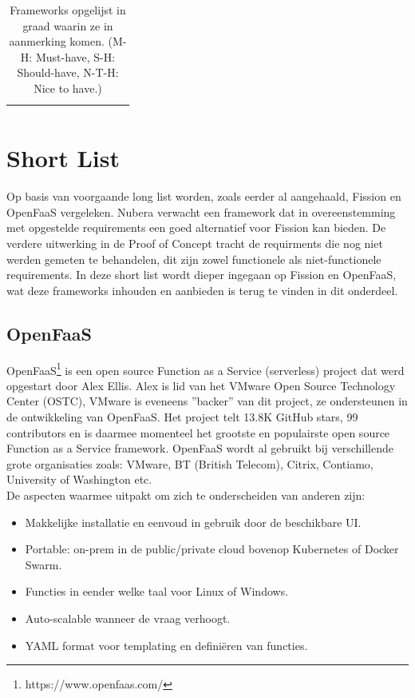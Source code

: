 \begin{table}[]
{\begin{tabular}{@{}llccccccccc@{}}
            &  & \multicolumn{1}{l}{} & \multicolumn{1}{l}{} & \multicolumn{1}{l}{} & \multicolumn{1}{l}{} & \multicolumn{1}{l}{} & \multicolumn{1}{l}{} & \multicolumn{1}{l}{} & \multicolumn{1}{l}{} & \multicolumn{1}{l}{} \\ \bottomrule
        \end{tabular}%
    }
    \caption{Frameworks opgelijst in graad waarin ze in aanmerking komen. (M-H: Must-have, S-H: Should-have, N-T-H: Nice to have.) }
    \label{tab:frameworks-samenvattingl}
\end{table}

\section{Short List}
\label{sec:short-list}
Op basis van voorgaande long list worden, zoals eerder al aangehaald, Fission en OpenFaaS vergeleken. Nubera verwacht een framework dat in overeenstemming met opgestelde requirements een goed alternatief voor Fission kan bieden. De verdere uitwerking in de Proof of Concept tracht de requirments die nog niet werden gemeten te behandelen, dit zijn zowel functionele als niet-functionele requirements. In deze short list wordt dieper ingegaan op Fission en OpenFaaS, wat deze frameworks inhouden en aanbieden is terug te vinden in dit onderdeel.

\subsection{OpenFaaS}
OpenFaaS\footnote{https://www.openfaas.com/} is een open source Function as a Service (serverless) project dat werd opgestart door Alex Ellis. Alex is lid van het VMware Open Source Technology Center (OSTC), VMware is eveneens ''backer'' van dit project, ze ondersteunen in de ontwikkeling van OpenFaaS. Het project telt 13.8K GitHub stars, 99 contributors en is daarmee momenteel het grootste en populairste open source Function as a Service framework. OpenFaaS wordt al gebruikt bij verschillende grote organisaties zoals: VMware, BT (British Telecom), Citrix, Contiamo, University of Washington etc.
\\
De aspecten waarmee \textcite{OpenFaaS2019} uitpakt om zich te onderscheiden van anderen zijn:
\begin{itemize}
    \item Makkelijke installatie en eenvoud in gebruik door de beschikbare UI.
    \item Portable: on-prem in de public/private cloud  bovenop Kubernetes of Docker Swarm.
    \item Functies in eender welke taal voor Linux of Windows.
    \item Auto-scalable wanneer de vraag verhoogt.
    \item YAML format voor templating en definiëren van functies.
\end{itemize}

